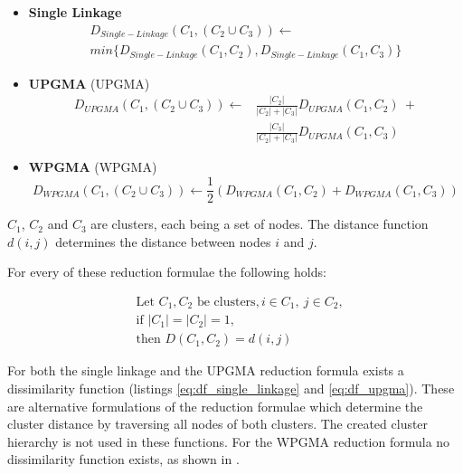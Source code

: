 \begin{itemize}
    \item \textbf{Single Linkage}
    \begin{multline}
    D_{Single-Linkage}(C_1, (C_2 \cup C_3)) \leftarrow \\
    min \{ D_{Single-Linkage}(C_1, C_2), D_{Single-Linkage}(C_1, C_3) \}
    \end{multline}
    \item \textbf{\acrshort{UPGMA}} (\acrlong{UPGMA})
    \begin{equation}
    \begin{split}
    D_{UPGMA}(C_1, (C_2 \cup C_3)) \leftarrow &\frac{|C_2|}{|C_2|+|C_3|}D_{UPGMA}(C_1, C_2)\ + \\ &\frac{|C_3|}{|C_2|+|C_3|}D_{UPGMA}(C_1, C_3)
    \end{split}
    \end{equation}
    \item \textbf{\acrshort{WPGMA}} (\acrlong{WPGMA})
    \begin{equation}
    D_{WPGMA}(C_1, (C_2 \cup C_3)) \leftarrow \frac{1}{2} (D_{WPGMA}(C_1, C_2) + D_{WPGMA}(C_1, C_3))
    \end{equation}
\end{itemize}

$C_1$, $C_2$ and $C_3$ are clusters, each being a set of nodes. The distance function $d(i, j)$ determines the distance between nodes $i$ and $j$.

For every of these reduction formulae the following holds:

\begin{equation}
\begin{split}
&\textrm{Let }C_1, C_2\textrm{ be clusters}, i \in C_1,\ j \in C_2, \\
&\textrm{if }|C_1| = |C_2| = 1, \\
&\textrm{then }D(C_1, C_2) = d(i, j)
\end{split}
\end{equation}

For both the single linkage and the \acrshort{UPGMA} reduction formula exists a dissimilarity function (listings \ref{eq:df_single_linkage} and \ref{eq:df_upgma}). These are alternative formulations of the reduction formulae which determine the cluster distance by traversing all nodes of both clusters. The created cluster hierarchy is not used in these functions. For the \acrshort{WPGMA} reduction formula no dissimilarity function exists, as shown in \cite{clustering:2007}.

